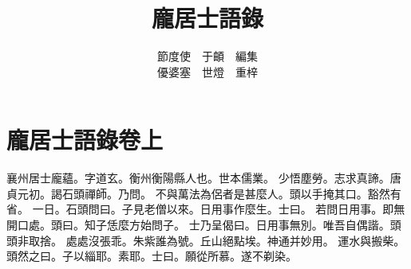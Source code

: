 \documentclass[a5j,12pt]{ltjtbook}
\title{\Huge{龐居士語錄}}
\author{節度使　于頔　編集\\優婆塞　世燈　重梓}
\date{}
\begin{document}
\maketitle

\onehalfspacing

\chapter*{龐居士語錄卷上}
\Large{襄州居士龐蘊。字道玄。衡州衡陽縣人也。世本儒業。
	少悟塵勞。志求真諦。唐貞元初。謁石頭禪師。乃問。
	不與萬法為侶者是甚麼人。頭以手掩其口。豁然有省。
	一日。石頭問曰。子見老僧以來。日用事作麼生。士曰。
	若問日用事。即無開口處。頭曰。知子恁麼方始問子。
	士乃呈偈曰。日用事無別。唯吾自偶諧。頭頭非取捨。
	處處沒張乖。朱紫誰為號。丘山絕點埃。神通并妙用。
	運水與搬柴。頭然之曰。子以緇耶。素耶。士曰。願從所慕。遂不剃染。}
\end{document}
